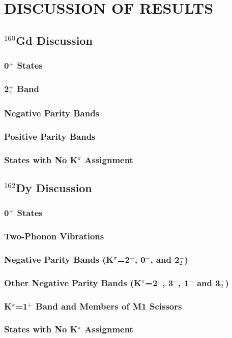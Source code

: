 \chapter{DISCUSSION OF RESULTS}\label{chp:DISCUSSION}
\section{$^{160}$Gd Discussion}
\subsection{0$^+$ States}
\subsection{2$^+_\gamma$ Band}
\subsection{Negative Parity Bands}
\subsection{Positive Parity Bands}
\subsection{States with No K$^\pi$ Assignment}
\section{$^{162}$Dy Discussion}
\subsection{0$^+$ States}
\subsection{Two-Phonon Vibrations}
\subsection{Negative Parity Bands (K$^\pi$=2$^-$, 0$^-$, and 2$^-_2$)}
\subsection{Other Negative Parity Bands (K$^\pi$=2$^-$, 3$^-$, 1$^-$ and 3$^-_2$)}
\subsection{K$^\pi$=1$^+$ Band and Members of M1 Scissors}
\subsection{States with No K$^\pi$ Assignment}